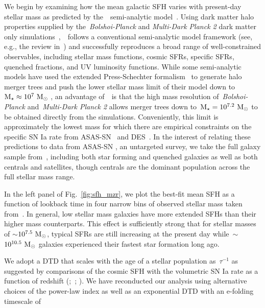 \documentclass[ms.tex]{subfiles}
\begin{document}
We begin by examining how the mean galactic SFH varies with present-day stellar
mass as predicted by the~\um~semi-analytic model~\citep{Behroozi2019}.
Using dark matter halo properties supplied by the~\textit{Bolshoi-Planck} and
\textit{Multi-Dark Planck 2} dark matter only simulations~\citep{Klypin2016,
RodriguezPuebla2016},~\um~follows a conventional semi-analytic model framework
(see, e.g., the review in~\citealt{Somerville2015a}) and successfully
reproduces a broad range of well-constrained observables, including stellar
mass functions, cosmic SFRs, specific SFRs, quenched fractions, and UV
luminosity functions.
While some semi-analytic models have used the extended Press-Schechter
formalism~\citep{Press1974, Bond1991} to generate halo merger trees and push
the lower stellar mass limit of their model down to~$\text{M}_\star \approx 10^7~\text{M}_\odot$
\citep[e.g.][]{Somerville2015b}, an advantage of~\um~is that the high mass
resolution of~\textit{Bolshoi-Planck} and~\textit{Multi-Dark Planck 2}
allows merger trees down to~$\text{M}_\star = 10^{7.2}~\text{M}_\odot$ to be obtained directly
from the simulations.
Conveniently, this limit is approximately the lowest mass for which there are
empirical constraints on the specific SN Ia rate from ASAS-SN~\citep{Brown2019}
and DES~\citep{Wiseman2021}.
In the interest of relating these predictions to data from ASAS-SN
\citep{Shappee2014, Kochanek2017}, an untargeted survey, we take the full
galaxy sample from~\um, including both star forming and quenched galaxies as
well as both centrals and satellites, though centrals are the dominant
population across the full stellar mass range.
\par
In the left panel of Fig.~\ref{fig:sfh_mzr}, we plot the best-fit mean SFH as a
function of lookback time in four narrow bins of observed stellar mass taken
from~\um.
In general, low stellar mass galaxies have more extended SFHs than their
higher mass counterparts.
This effect is sufficiently strong that for stellar masses of
$\sim$$10^{7.5}~\text{M}_\odot$, typical SFRs are still increasing at the present day
while~$\sim$$10^{10.5}~\text{M}_\odot$ galaxies experienced their fastest star formation
long ago.
\par
We adopt a DTD that scales with the age of a stellar population as~$\tau^{-1}$
as suggested by comparisons of the cosmic SFH with the volumetric SN Ia rate
as a function of redshift (\citealp{Maoz2012a};~\citealp*{Maoz2012b};
\citealp{Graur2013, Graur2014}).
We have reconducted our analysis using alternative choices of the power-law
index as well as an exponential DTD with an e-folding timescale of
\end{document}
